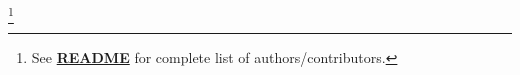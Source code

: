 \footnote{See \href{https://github.com/olehermanse/INF3490-AI_Machine_Learning/blob/master/README.md}{\textbf{README}} for complete list of authors/contributors.}
